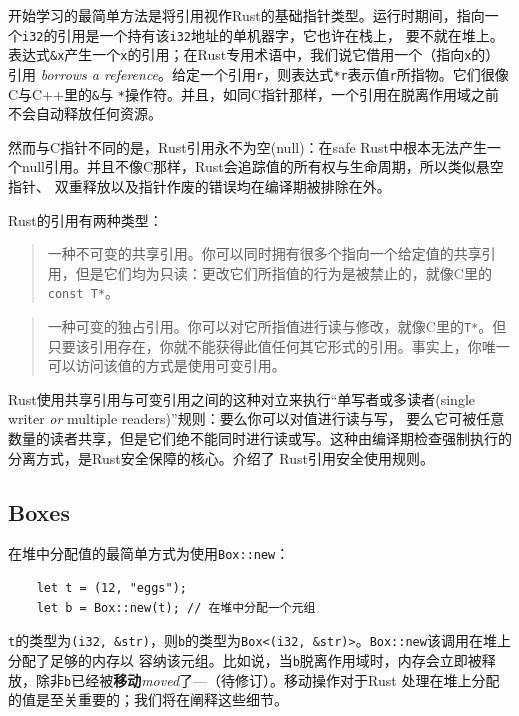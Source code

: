 \medskip
开始学习的最简单方法是将引用视作Rust的基础指针类型。运行时期间，指向一个\texttt{i32}的引用是一个持有该\texttt{i32}地址的单机器字，它也许在栈上，
要不就在堆上。表达式\texttt{\&x}产生一个\texttt{x}的引用；在Rust专用术语中，我们说它借用一个（指向\texttt{x}的）引用
\textit{borrows a reference}。给定一个引用\texttt{r}，则表达式\texttt{*r}表示值\texttt{r}所指物。它们很像C与C++里的\texttt{\&}与
\texttt{*}操作符。并且，如同C指针那样，一个引用在脱离作用域之前不会自动释放任何资源。

\medskip
然而与C指针不同的是，Rust引用永不为空(null)：在safe Rust中根本无法产生一个null引用。并且不像C那样，Rust会追踪值的所有权与生命周期，所以类似悬空指针、
双重释放以及指针作废的错误均在编译期被排除在外。

\medskip
Rust的引用有两种类型：

\medskip
{}
    \begin{quote}
        一种不可变的共享引用。你可以同时拥有很多个指向一个给定值的共享引用，但是它们均为只读：更改它们所指值的行为是被禁止的，就像C里的
        \texttt{const T*}。
    \end{quote}
\medskip
{}
    \begin{quote}
        一种可变的独占引用。你可以对它所指值进行读与修改，就像C里的\texttt{T*}。但只要该引用存在，你就不能获得此值任何其它形式的引用。事实上，你唯一
        可以访问该值的方式是使用可变引用。
    \end{quote}

\medskip
Rust使用共享引用与可变引用之间的这种对立来执行“单写者或多读者(single writer \textit{or} multiple readers)”规则：要么你可以对值进行读与写，
要么它可被任意数量的读者共享，但是它们绝不能同时进行读或写。这种由编译期检查强制执行的分离方式，是Rust安全保障的核心。介绍了
Rust引用安全使用规则。

\medskip
\subsection{Boxes}
在堆中分配值的最简单方式为使用\texttt{Box::new}：
\begin{verbatim}
    let t = (12, "eggs");
    let b = Box::new(t); // 在堆中分配一个元组
\end{verbatim}
 
\smallskip
\texttt{t}的类型为\texttt{(i32, \&str)}，则\texttt{b}的类型为\texttt{Box<(i32, \&str)>}。\texttt{Box::new}该调用在堆上分配了足够的内存以
容纳该元组。比如说，当\texttt{b}脱离作用域时，内存会立即被释放，除非\texttt{b}已经被\textbf{移动}\textit{moved}了---（待修订）。移动操作对于Rust
处理在堆上分配的值是至关重要的；我们将在阐释这些细节。

